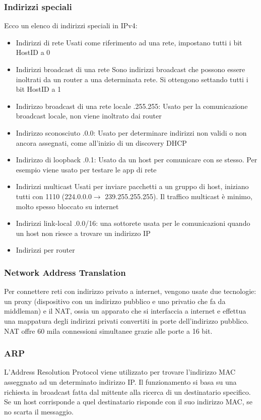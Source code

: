 \documentclass[12pt, a4paper]{article}
\begin{document}
\subsubsection{Indirizzi speciali}
Ecco un elenco di indirizzi speciali in IPv4:
\begin{itemize}
    \item Indirizzi di rete
    \subitem Usati come riferimento ad una rete, impostano tutti i bit HostID a 0
    \item Indirizzi broadcast di una rete
    \subitem Sono indirizzi broadcast che possono essere inoltrati da un router a una determinata rete. Si 
    ottengono settando tutti i bit HostID a 1
    \item Indirizzo broadcast di una rete locale
    .255.255: Usato per la comunicazione broadcast locale, non viene inoltrato dai router  
    \item Indirizzo sconosciuto
    .0.0: Usato per determinare indirizzi non validi o non ancora assegnati, come all'inizio 
    di un discovery DHCP 
    \item Indirizzo di loopback
    .0.1: Usato da un host per comunicare con se stesso. Per esempio viene usato per testare le 
    app di rete 
    \item Indirizzi multicast
    \subitem Usati per inviare pacchetti a un gruppo di host, iniziano tutti con 1110 (224.0.0.0$\to$
    239.255.255.255). Il traffico multicast è minimo, molto spesso bloccato su internet
    \item Indirizzi link-local
    .0.0/16: una sottorete usata per le comunicazioni quando un host non riesce a trovare 
    un indirizzo IP
    \item Indirizzi per router
\end{itemize}


\subsubsection{Network Address Translation}
Per connettere reti con indirizzo privato a internet, vengono usate due tecnologie: un proxy (dispositivo con un 
indirizzo pubblico e uno privatio che fa da middleman) e il NAT, ossia un apparato che si interfaccia a internet 
e effettua una mappatura degli indirizzi privati convertiti in porte dell'indirizzo pubblico.\\
NAT offre 60 mila connessioni simultanee grazie alle porte a 16 bit.

\subsubsection{ARP}
L'Address Resolution Protocol viene utilizzato per trovare l'indirizzo MAC asseggnato ad un determinato indirizzo
IP. Il funzionamento si basa su una richiesta in broadcast fatta dal mittente alla ricerca di un destinatario 
specifico. Se un host corrisponde a quel destinatario risponde con il suo indirizzo MAC, se no scarta il messaggio.
\end{document}
